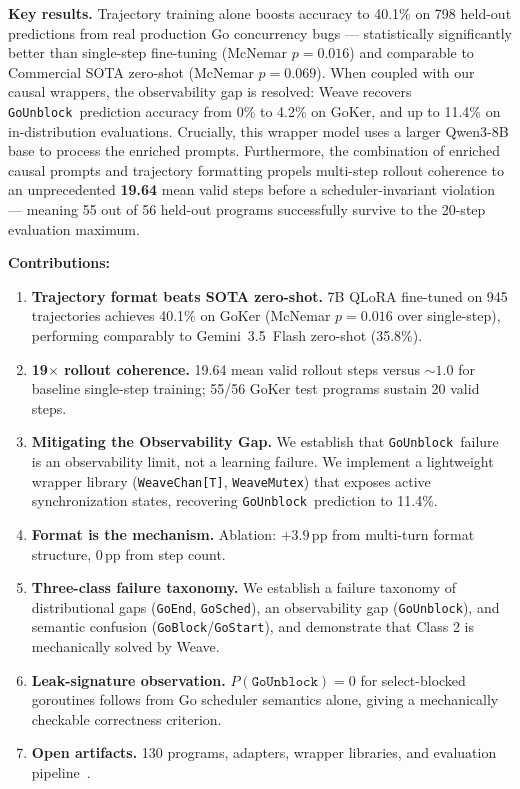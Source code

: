 \documentclass[10pt,conference]{IEEEtran}
\newcommand{\eblock}{\texttt{GoBlock}}
\newcommand{\eunblock}{\texttt{GoUnblock}}
\newcommand{\estart}{\texttt{GoStart}}
\newcommand{\eend}{\texttt{GoEnd}}
\newcommand{\esched}{\texttt{GoSched}}
\begin{document}
\textbf{Key results.}
Trajectory training alone boosts accuracy to 40.1\% on 798 held-out
predictions from real production Go concurrency bugs — statistically
significantly better than single-step fine-tuning (McNemar $p{=}0.016$)
and comparable to Commercial SOTA zero-shot (McNemar $p{=}0.069$).
When coupled with our causal wrappers, the observability gap is resolved:
Weave recovers \eunblock\ prediction accuracy from 0\% to 4.2\% on GoKer, and up to 11.4\% on in-distribution evaluations.
Crucially, this wrapper model uses a larger Qwen3-8B base to process the enriched prompts.
Furthermore, the combination of enriched causal prompts and trajectory formatting
propels multi-step rollout coherence to an unprecedented \textbf{19.64} mean valid steps
before a scheduler-invariant violation — meaning 55 out of 56 held-out programs successfully
survive to the 20-step evaluation maximum.

\textbf{Contributions:}
\begin{enumerate}
\item \textbf{Trajectory format beats SOTA zero-shot.}
  7B QLoRA fine-tuned on 945 trajectories achieves 40.1\% on GoKer
  (McNemar $p{=}0.016$ over single-step), performing comparably to Gemini~3.5~Flash zero-shot (35.8\%).
\item \textbf{19$\times$ rollout coherence.}
  19.64 mean valid rollout steps versus ${\sim}1.0$ for baseline
  single-step training; 55/56 GoKer test programs sustain 20 valid steps.
\item \textbf{Mitigating the Observability Gap.}
  We establish that \eunblock\ failure is an observability limit, not a learning failure.
  We implement a lightweight wrapper library (\texttt{WeaveChan[T]}, \texttt{WeaveMutex})
  that exposes active synchronization states, recovering \eunblock\ prediction to 11.4\%.
\item \textbf{Format is the mechanism.}
  Ablation: $+3.9$\,pp from multi-turn format structure, $0$\,pp from step count.
\item \textbf{Three-class failure taxonomy.}
  We establish a failure taxonomy of distributional gaps (\eend, \esched), an observability gap (\eunblock), and semantic confusion (\eblock/\estart), and demonstrate that Class 2 is mechanically solved by Weave.
\item \textbf{Leak-signature observation.}
  $P(\eunblock){=}0$ for select-blocked goroutines follows from Go
  scheduler semantics alone, giving a mechanically checkable correctness criterion.
\item \textbf{Open artifacts.}
  130 programs, adapters, wrapper libraries, and evaluation pipeline~\cite{anon-artifacts}.
\end{enumerate}
\end{document}
